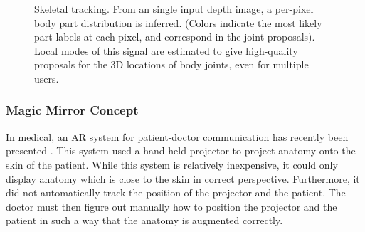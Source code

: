 \begin{figure}
	\centering
	\quad
	\caption{Skeletal tracking. From an single input depth image, a per-pixel body part distribution is inferred. (Colors indicate the most likely part labels at each pixel, and correspond in the joint proposals). Local modes of this signal are estimated to give high-quality proposals for the 3D locations of body joints, even for multiple users.}
	\label{fig:2-bg:skeleton}
\end{figure}

\subsubsection{Magic Mirror Concept}
In medical, an AR system for patient-doctor communication has recently been presented \cite{Ni2011}. This system used a hand-held projector to project anatomy onto the skin of the patient. While this system is relatively inexpensive, it could only display anatomy which is close to the skin in correct perspective. Furthermore, it did not automatically track the position of the projector and the patient. The doctor must then figure out manually how to position the projector and the patient in such a way that the anatomy is augmented correctly. 

